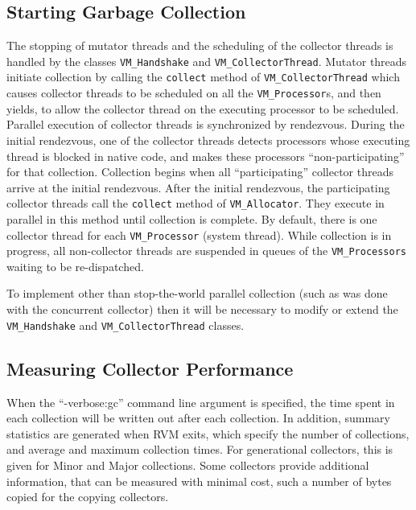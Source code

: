 \subsection{Starting Garbage Collection} \label{sssec:startgc}
The stopping of mutator threads and the scheduling of the collector
threads is handled by the classes 
{\tt VM\_Handshake} and {\tt VM\_CollectorThread}.
Mutator threads initiate collection by calling the {\tt collect} method
of {\tt VM\_CollectorThread} which causes collector threads to be scheduled
on all the {\tt VM\_Processor}s, and then yields, to allow the collector thread
on the executing processor to be scheduled.
Parallel execution of collector threads is synchronized by rendezvous.
During the initial rendezvous, one of the collector threads detects
processors whose executing thread is blocked in native code, and makes
these processors ``non-participating'' for that collection.
Collection begins when all ``participating'' collector threads
arrive at the initial rendezvous.
After the initial rendezvous, the participating collector threads
call the {\tt collect} method of {\tt VM\_Allocator}.  They execute
in parallel in this method until collection is complete.  By default,
there is one collector thread for each {\tt VM\_Processor} (system thread).
While collection is in progress, all non-collector threads are suspended
in queues of the {\tt VM\_Processors} waiting to be re-dispatched.

To implement other than stop-the-world parallel collection 
(such as was done with the concurrent collector) then it will be necessary to modify
or extend the {\tt VM\_Handshake} and {\tt VM\_CollectorThread} classes.

\subsection{Measuring Collector Performance} \label{sssec:verbosegc}
When the ``-verbose:gc'' command line argument is specified, the time
spent in each collection will be written out after each collection.
In addition, summary statistics are generated when RVM exits, which
specify the number of collections, and average and maximum collection times.
For generational collectors, this is given for Minor and Major collections.
Some collectors provide additional information, that can be measured
with minimal cost, such a number of bytes copied for the copying collectors.

